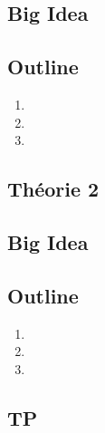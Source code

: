 \documentclass{article}
\begin{document}
\subsection*{Big Idea}
\subsection*{Outline}
\begin{enumerate}
    \item
    \item
    \item
\end{enumerate}
\subsection{Théorie 2}
\subsection*{Big Idea}
\subsection*{Outline}
\begin{enumerate}
    \item
    \item
    \item
\end{enumerate}
\subsection{TP}

\pagebreak
\end{document}
